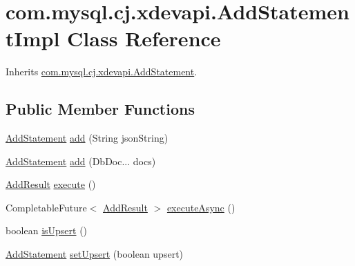 \hypertarget{classcom_1_1mysql_1_1cj_1_1xdevapi_1_1_add_statement_impl}{}\section{com.\+mysql.\+cj.\+xdevapi.\+Add\+Statement\+Impl Class Reference}
\label{classcom_1_1mysql_1_1cj_1_1xdevapi_1_1_add_statement_impl}


Inherits \mbox{\hyperlink{interfacecom_1_1mysql_1_1cj_1_1xdevapi_1_1_add_statement}{com.\+mysql.\+cj.\+xdevapi.\+Add\+Statement}}.

\subsection*{Public Member Functions}
\begin{DoxyCompactItemize}
\item 
\mbox{\hyperlink{interfacecom_1_1mysql_1_1cj_1_1xdevapi_1_1_add_statement}{Add\+Statement}} \mbox{\hyperlink{classcom_1_1mysql_1_1cj_1_1xdevapi_1_1_add_statement_impl_abba297ed8c7bfb2afad21bebcb3ca13a}{add}} (String json\+String)
\item 
\mbox{\hyperlink{interfacecom_1_1mysql_1_1cj_1_1xdevapi_1_1_add_statement}{Add\+Statement}} \mbox{\hyperlink{classcom_1_1mysql_1_1cj_1_1xdevapi_1_1_add_statement_impl_a59bdfcc8a26ee55966f9a1ad5a7b2303}{add}} (Db\+Doc... docs)
\item 
\mbox{\hyperlink{interfacecom_1_1mysql_1_1cj_1_1xdevapi_1_1_add_result}{Add\+Result}} \mbox{\hyperlink{classcom_1_1mysql_1_1cj_1_1xdevapi_1_1_add_statement_impl_a4448de4bfd47a9a6316509ff4ca0b9d1}{execute}} ()
\item 
Completable\+Future$<$ \mbox{\hyperlink{interfacecom_1_1mysql_1_1cj_1_1xdevapi_1_1_add_result}{Add\+Result}} $>$ \mbox{\hyperlink{classcom_1_1mysql_1_1cj_1_1xdevapi_1_1_add_statement_impl_abd553acbd2c91815014b2708a26ccb8f}{execute\+Async}} ()
\item 
boolean \mbox{\hyperlink{classcom_1_1mysql_1_1cj_1_1xdevapi_1_1_add_statement_impl_ac138d6c3ba88d8d8b1d90703decb0908}{is\+Upsert}} ()
\item 
\mbox{\hyperlink{interfacecom_1_1mysql_1_1cj_1_1xdevapi_1_1_add_statement}{Add\+Statement}} \mbox{\hyperlink{classcom_1_1mysql_1_1cj_1_1xdevapi_1_1_add_statement_impl_a8470fab763b1cfa3555d5dfd7854df2c}{set\+Upsert}} (boolean upsert)
\end{DoxyCompactItemize}


